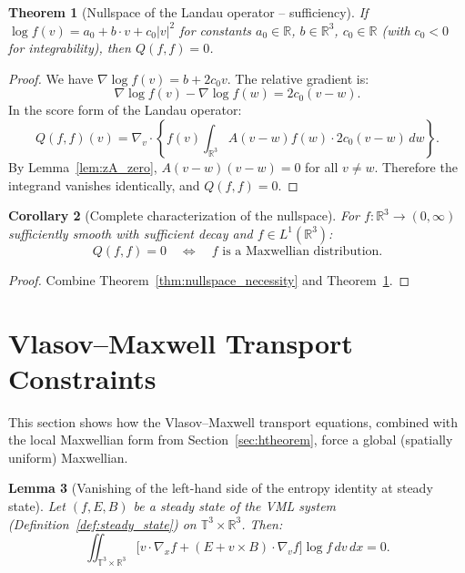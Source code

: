\documentclass[11pt]{article}
\newcommand{\R}{\mathbb{R}}
\newcommand{\T}{\mathbb{T}}
\newtheorem{theorem}{Theorem}
\newtheorem{lemma}[theorem]{Lemma}
\newtheorem{corollary}[theorem]{Corollary}
\begin{document}
\begin{theorem}[Nullspace of the Landau operator -- sufficiency]
\label{thm:nullspace_sufficiency}
If $\log f(v) = a_0 + b \cdot v + c_0 |v|^2$ for constants $a_0 \in \R$, $b \in \R^3$, $c_0 \in \R$ (with $c_0 < 0$ for integrability), then $Q(f, f) = 0$.
\end{theorem}

\begin{proof}
We have $\nabla \log f(v) = b + 2c_0 v$. The relative gradient is:
\[
\nabla \log f(v) - \nabla \log f(w) = 2c_0(v - w).
\]
In the score form of the Landau operator:
\[
Q(f,f)(v) = \nabla_v \cdot \left\{ f(v) \int_{\R^3} A(v-w) f(w) \cdot 2c_0(v-w) \, dw \right\}.
\]
By Lemma~\ref{lem:zA_zero}, $A(v-w)(v-w) = 0$ for all $v \neq w$. Therefore the integrand vanishes identically, and $Q(f,f) = 0$.
\end{proof}

\begin{corollary}[Complete characterization of the nullspace]
\label{cor:nullspace}
For $f : \R^3 \to (0, \infty)$ sufficiently smooth with sufficient decay and $f \in L^1(\R^3)$:
\[
Q(f, f) = 0 \quad \iff \quad f \text{ is a Maxwellian distribution.}
\]
\end{corollary}

\begin{proof}
Combine Theorem~\ref{thm:nullspace_necessity} and Theorem~\ref{thm:nullspace_sufficiency}.
\end{proof}

\section{Vlasov--Maxwell Transport Constraints}
\label{sec:transport}

This section shows how the Vlasov--Maxwell transport equations, combined with the local Maxwellian form from Section~\ref{sec:htheorem}, force a global (spatially uniform) Maxwellian.

\begin{lemma}[Vanishing of the left-hand side of the entropy identity at steady state]
\label{lem:lhs_vanishes}
Let $(f, E, B)$ be a steady state of the VML system (Definition~\ref{def:steady_state}) on $\T^3 \times \R^3$. Then:
\[
\iint_{\T^3 \times \R^3} \big[v \cdot \nabla_x f + (E + v \times B) \cdot \nabla_v f\big] \log f \, dv \, dx = 0.
\]
\end{lemma}
\end{document}
